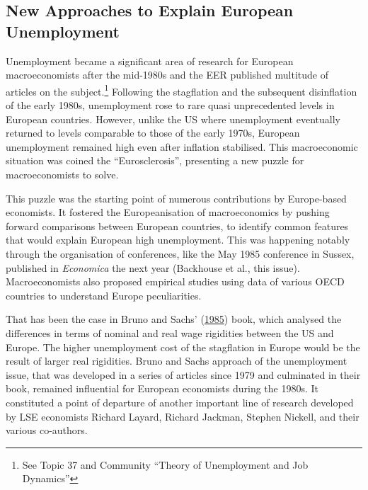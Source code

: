 \documentclass[
  12pt,
  onecolumn]{article}
\begin{document}
\hypertarget{unemployment}{%
\subsection{New Approaches to Explain European
Unemployment}\label{unemployment}}

Unemployment became a significant area of research for European
macroeconomists after the mid-1980s and the EER published multitude of
articles on the subject.\footnote{See Topic 37 and Community ``Theory of
  Unemployment and Job Dynamics''} Following the stagflation and the
subsequent disinflation of the early 1980s, unemployment rose to rare
quasi unprecedented levels in European countries. However, unlike the US
where unemployment eventually returned to levels comparable to those of
the early 1970s, European unemployment remained high even after
inflation stabilised. This macroeconomic situation was coined the
``Eurosclerosis'', presenting a new puzzle for macroeconomists to solve.

This puzzle was the starting point of numerous contributions by
Europe-based economists. It fostered the Europeanisation of
macroeconomics by pushing forward comparisons between European
countries, to identify common features that would explain European high
unemployment. This was happening notably through the organisation of
conferences, like the May 1985 conference in Sussex, published in
\emph{Economica} the next year (Backhouse et al., this issue).
Macroeconomists also proposed empirical studies using data of various
OECD countries to understand Europe peculiarities.

That has been the case in Bruno and Sachs'
(\protect\hyperlink{ref-brunosachs1985}{1985}) book, which analysed the
differences in terms of nominal and real wage rigidities between the US
and Europe. The higher unemployment cost of the stagflation in Europe
would be the result of larger real rigidities. Bruno and Sachs approach
of the unemployment issue, that was developed in a series of articles
since 1979 and culminated in their book, remained influential for
European economists during the 1980s. It constituted a point of
departure of another important line of research developed by LSE
economists Richard Layard, Richard Jackman, Stephen Nickell, and their
various co-authors.
\end{document}
